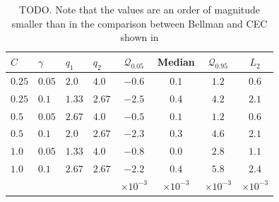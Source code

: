 \documentclass[main.tex]{subfiles}
\begin{document}
\begin{table}[htbp]
  \centering
  \begin{tabular}{llllcccc}
    $C$ & $\gamma$ & $q_1$ & $q_2$ & $\mathcal Q_{0.05}$
    &Median & $\mathcal Q_{0.95}$ &$L_2$\\
    \toprule
    $0.25$ & $0.05$ & $2.0$ & $4.0$ & $-0.6$ & $0.1$ & $1.2$ & $0.6$ \\
    $0.25$ & $0.1$ & $1.33$ & $2.67$ & $-2.5$ & $0.4$ & $4.2$ & $2.1$ \\
    $0.5$ & $0.05$ & $2.67$ & $4.0$ & $-0.5$ & $0.1$ & $1.2$ & $0.6$ \\
    $0.5$ & $0.1$ & $2.0$ & $2.67$ & $-2.3$ & $0.3$ & $4.6$ & $2.1$ \\
    $1.0$ & $0.05$ & $1.33$ & $4.0$ & $-0.8$ & $0.0$ & $2.8$ & $1.1$ \\
    $1.0$ & $0.1$ & $2.67$ & $2.67$ & $-2.2$ & $0.4$ & $5.8$ & $2.4$ \\
        &&&&$\times 10^{-3}$&$\times 10^{-3}$&$\times 10^{-3}$&$\times 10^{-3}$\\
    \bottomrule
  \end{tabular}
  \caption{TODO. Note that the values are an order of magnitude
    smaller than in the comparison between Bellman and CEC shown in }\label{tbl:paramcomparisons_olfc}
\end{table}


\biblio
\end{document}
